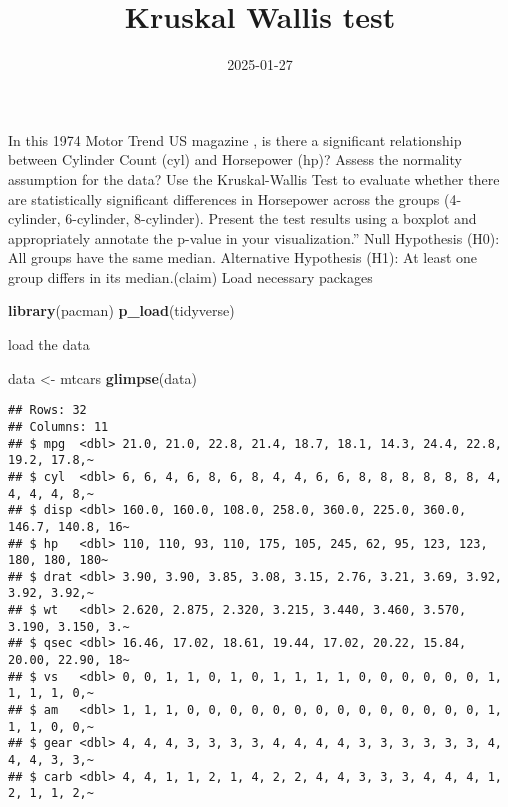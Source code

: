 \documentclass[
]{article}
\title{Kruskal Wallis test}
\author{}
\date{\vspace{-2.5em}2025-01-27}
\newenvironment{Shaded}{\begin{snugshade}}{\end{snugshade}}
\newcommand{\FunctionTok}[1]{\textcolor[rgb]{0.13,0.29,0.53}{\textbf{#1}}}
\newcommand{\NormalTok}[1]{#1}
\newcommand{\OtherTok}[1]{\textcolor[rgb]{0.56,0.35,0.01}{#1}}
\begin{document}
\maketitle

In this 1974 Motor Trend US magazine , is there a significant
relationship between Cylinder Count (cyl) and Horsepower (hp)? Assess
the normality assumption for the data? Use the Kruskal-Wallis Test to
evaluate whether there are statistically significant differences in
Horsepower across the groups (4-cylinder, 6-cylinder, 8-cylinder).
Present the test results using a boxplot and appropriately annotate the
p-value in your visualization.'' Null Hypothesis (H0): All groups have
the same median. Alternative Hypothesis (H1): At least one group differs
in its median.(claim) Load necessary packages

\begin{Shaded}
\begin{Highlighting}[]
\FunctionTok{library}\NormalTok{(pacman)}
\FunctionTok{p\_load}\NormalTok{(tidyverse)}
\end{Highlighting}
\end{Shaded}

load the data

\begin{Shaded}
\begin{Highlighting}[]
\NormalTok{data }\OtherTok{\textless{}{-}}\NormalTok{ mtcars}
\FunctionTok{glimpse}\NormalTok{(data)}
\end{Highlighting}
\end{Shaded}

\begin{verbatim}
## Rows: 32
## Columns: 11
## $ mpg  <dbl> 21.0, 21.0, 22.8, 21.4, 18.7, 18.1, 14.3, 24.4, 22.8, 19.2, 17.8,~
## $ cyl  <dbl> 6, 6, 4, 6, 8, 6, 8, 4, 4, 6, 6, 8, 8, 8, 8, 8, 8, 4, 4, 4, 4, 8,~
## $ disp <dbl> 160.0, 160.0, 108.0, 258.0, 360.0, 225.0, 360.0, 146.7, 140.8, 16~
## $ hp   <dbl> 110, 110, 93, 110, 175, 105, 245, 62, 95, 123, 123, 180, 180, 180~
## $ drat <dbl> 3.90, 3.90, 3.85, 3.08, 3.15, 2.76, 3.21, 3.69, 3.92, 3.92, 3.92,~
## $ wt   <dbl> 2.620, 2.875, 2.320, 3.215, 3.440, 3.460, 3.570, 3.190, 3.150, 3.~
## $ qsec <dbl> 16.46, 17.02, 18.61, 19.44, 17.02, 20.22, 15.84, 20.00, 22.90, 18~
## $ vs   <dbl> 0, 0, 1, 1, 0, 1, 0, 1, 1, 1, 1, 0, 0, 0, 0, 0, 0, 1, 1, 1, 1, 0,~
## $ am   <dbl> 1, 1, 1, 0, 0, 0, 0, 0, 0, 0, 0, 0, 0, 0, 0, 0, 0, 1, 1, 1, 0, 0,~
## $ gear <dbl> 4, 4, 4, 3, 3, 3, 3, 4, 4, 4, 4, 3, 3, 3, 3, 3, 3, 4, 4, 4, 3, 3,~
## $ carb <dbl> 4, 4, 1, 1, 2, 1, 4, 2, 2, 4, 4, 3, 3, 3, 4, 4, 4, 1, 2, 1, 1, 2,~
\end{verbatim}
\end{document}
